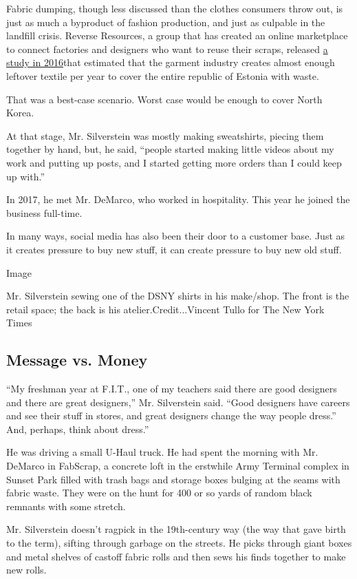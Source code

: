 Fabric dumping, though less discussed than the clothes consumers throw
out, is just as much a byproduct of fashion production, and just as
culpable in the landfill crisis. Reverse Resources, a group that has
created an online marketplace to connect factories and designers who
want to reuse their scraps, released
\href{https://reverseresources.net/news/how-much-does-garment-industry-actually-waste}{a
study in 2016}that estimated that the garment industry creates almost
enough leftover textile per year to cover the entire republic of Estonia
with waste.

That was a best-case scenario. Worst case would be enough to cover North
Korea.

At that stage, Mr. Silverstein was mostly making sweatshirts, piecing
them together by hand, but, he said, ``people started making little
videos about my work and putting up posts, and I started getting more
orders than I could keep up with.''

In 2017, he met Mr. DeMarco, who worked in hospitality. This year he
joined the business full-time.

In many ways, social media has also been their door to a customer base.
Just as it creates pressure to buy new stuff, it can create pressure to
buy new old stuff.

Image

Mr. Silverstein sewing one of the DSNY shirts in his make/shop. The
front is the retail space; the back is his atelier.Credit...Vincent
Tullo for The New York Times

\hypertarget{message-vs-money}{%
\subsection{Message vs. Money}\label{message-vs-money}}

``My freshman year at F.I.T., one of my teachers said there are good
designers and there are great designers,'' Mr. Silverstein said. ``Good
designers have careers and see their stuff in stores, and great
designers change the way people dress.'' And, perhaps, think about
dress.''

He was driving a small U-Haul truck. He had spent the morning with Mr.
DeMarco in FabScrap, a concrete loft in the erstwhile Army Terminal
complex in Sunset Park filled with trash bags and storage boxes bulging
at the seams with fabric waste. They were on the hunt for 400 or so
yards of random black remnants with some stretch.

Mr. Silverstein doesn't ragpick in the 19th-century way (the way that
gave birth to the term), sifting through garbage on the streets. He
picks through giant boxes and metal shelves of castoff fabric rolls and
then sews his finds together to make new rolls.

